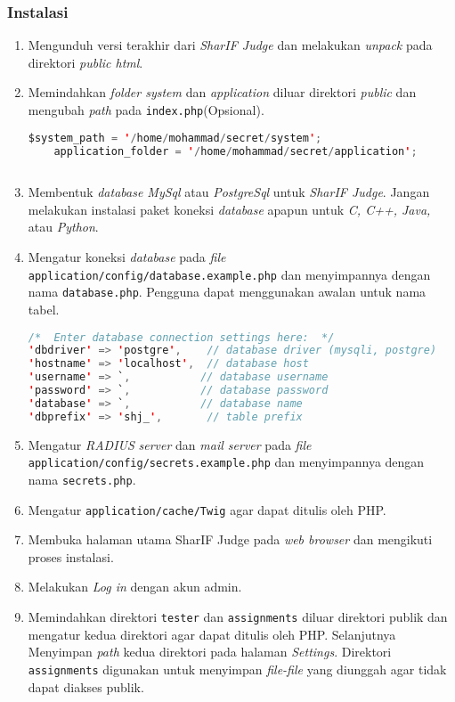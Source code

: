 \subsubsection{Instalasi}
\begin{enumerate}
\item Mengunduh versi terakhir dari \textit{SharIF Judge} dan melakukan \textit{unpack} pada direktori \textit{public html}.
\item Memindahkan \textit{folder system} dan \textit{application} diluar direktori \textit{public} dan mengubah \textit{path} pada \verb|index.php|(Opsional).

\begin{lstlisting}[language=Java, caption=Contoh \textit{path} pada halaman index.php, label=kode:movesystemandapp]
	$system_path = '/home/mohammad/secret/system';
	application_folder = '/home/mohammad/secret/application';
	
\end{lstlisting}
\item Membentuk \textit{database MySql} atau \textit{PostgreSql} untuk \textit{SharIF Judge}. Jangan melakukan instalasi paket koneksi \textit{database} apapun untuk \textit{C, C++, Java,} atau \textit{Python}.
\item Mengatur koneksi \textit{database} pada \textit{file} \verb|application/config/database.example.php| dan menyimpannya dengan nama \verb|database.php|. Pengguna dapat menggunakan awalan untuk nama tabel.

\begin{lstlisting}[language=Java, caption=Contoh pengaturan koneksi untuk \textit{database}, label=kode:dbsetup]
/*  Enter database connection settings here:  */
'dbdriver' => 'postgre',    // database driver (mysqli, postgre)
'hostname' => 'localhost',  // database host
'username' => `,           // database username
'password' => `,           // database password
'database' => `,           // database name
'dbprefix' => 'shj_',       // table prefix
\end{lstlisting}
\item Mengatur \textit{RADIUS} \textit{server} dan \textit{mail server} pada \textit{file} \verb|application/config/secrets.example.php| dan menyimpannya dengan nama \verb|secrets.php|.
\item Mengatur \verb|application/cache/Twig| agar dapat ditulis oleh PHP.
\item Membuka halaman utama SharIF Judge pada \textit{web browser} dan mengikuti proses instalasi.
\item Melakukan \textit{Log in} dengan akun admin.
\item Memindahkan direktori \verb|tester| dan \verb|assignments| diluar direktori publik dan mengatur kedua direktori agar dapat ditulis oleh PHP. Selanjutnya Menyimpan \textit{path} kedua direktori pada halaman \textit{Settings}. Direktori \verb|assignments| digunakan untuk menyimpan \textit{file-file} yang diunggah agar tidak dapat diakses publik.

\end{enumerate}


